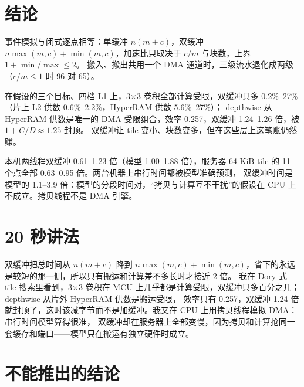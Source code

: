 \documentclass[11pt,a4paper]{ctexart}
\begin{document}
\section{结论}\label{sec:conclusion}

\begin{findingbox}[：模型]
事件模拟与闭式逐点相等：单缓冲 $n(m+c)$，双缓冲 $n\max(m,c)+\min(m,c)$，加速比只取决于 $c/m$ 与块数，上界 $1+\min/\max\le2$。
搬入、搬出共用一个 DMA 通道时，三级流水退化成两级（$c/m\le1$ 时 96 对 65）。
\end{findingbox}

\begin{findingbox}[：搜索]
在假设的三个目标、四档 L1 上，3×3 卷积全部计算受限，双缓冲只多 0.2\%--27\%（片上 L2 供数 0.6\%--2.2\%，HyperRAM 供数 5.6\%--27\%）；
depthwise 从 HyperRAM 供数是唯一的 DMA 受限组合，效率 0.257，双缓冲 1.24--1.26 倍，被 $1 + C/D\approx1.25$ 封顶。
双缓冲让 tile 变小、块数变多，但在这些层上这笔账仍然赚。
\end{findingbox}

\begin{findingbox}[：实测]
本机两线程双缓冲 0.61--1.23 倍（模型 1.00--1.88 倍），服务器 64 KiB tile 的 11 个点全部 0.63--0.95 倍。两台机器上串行时间都被模型准确预测，
双缓冲时间是模型的 1.1--3.9 倍：模型的分段时间对，“拷贝与计算互不干扰”的假设在 CPU 上不成立。拷贝线程不是 DMA 引擎。
\end{findingbox}

\section{20 秒讲法}\label{sec:pitch}

双缓冲把总时间从 $n(m+c)$ 降到 $n\max(m,c)+\min(m,c)$，省下的永远是较短的那一侧，所以只有搬运和计算差不多长时才接近 2 倍。
我在 Dory 式 tile 搜索里看到，3×3 卷积在 MCU 上几乎都是计算受限，双缓冲只多百分之几；depthwise 从片外 HyperRAM 供数是搬运受限，
效率只有 0.257，双缓冲 1.24 倍就封顶了，这时该减字节而不是加缓冲。我又在 CPU 上用拷贝线程模拟 DMA：串行时间模型算得很准，
双缓冲却在服务器上全部变慢，因为拷贝和计算抢同一套缓存和端口——模型只在搬运有独立硬件时成立。

\section{不能推出的结论}\label{sec:caveat}
\end{document}
